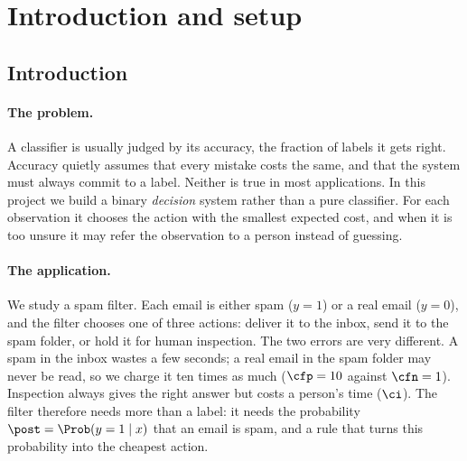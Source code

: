 \section{Introduction and setup}

\subsection{Introduction}
\label{sec:intro}

\paragraph{The problem.}
A classifier is usually judged by its accuracy, the fraction of labels it gets right. Accuracy
quietly assumes that every mistake costs the same, and that the system must always commit to a label.
Neither is true in most applications. In this project we build a binary \emph{decision} system rather
than a pure classifier. For each observation it chooses the action with the smallest expected cost,
and when it is too unsure it may refer the observation to a person instead of guessing.

\paragraph{The application.}
We study a spam filter. Each email is either spam ($y=1$) or a real email ($y=0$), and the filter
chooses one of three actions: deliver it to the inbox, send it to the spam folder, or hold it for
human inspection. The two errors are very different. A spam in the inbox wastes a few seconds; a real
email in the spam folder may never be read, so we charge it ten times as much ($\cfp=10$ against
$\cfn=1$). Inspection always gives the right answer but costs a person's time ($\ci$). The filter
therefore needs more than a label: it needs the probability $\post=\Prob(y=1\mid x)$ that an email is
spam, and a rule that turns this probability into the cheapest action.

